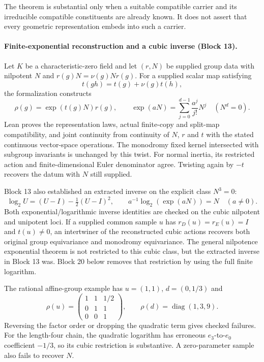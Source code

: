 \documentclass[11pt]{article}
\theoremstyle{definition}
\theoremstyle{remark}
\begin{document}
The theorem is substantial only when a suitable compatible carrier and its irreducible compatible constituents are already known.  It does not assert that every geometric representation embeds into such a carrier.


\paragraph{Finite-exponential reconstruction and a cubic inverse (Block 13).}
Let $K$ be a characteristic-zero field and let $(r,N)$ be supplied group data
with nilpotent $N$ and $r(g)N=\nu(g)Nr(g)$. For a supplied scalar map satisfying
\[
t(gh)=t(g)+\nu(g)t(h),
\]
the formalization constructs
\[
\rho(g)=\exp(t(g)N)r(g),\qquad
\exp(aN)=\sum_{j=0}^{d-1}\frac{a^j}{j!}N^j\quad(N^d=0).
\]
Lean proves the representation laws, actual finite-copy and split-map
compatibility, and joint continuity from continuity of $N$, $r$ and $t$ with
the stated continuous vector-space operations. The monodromy fixed kernel
intersected with subgroup invariants is unchanged by this twist. For normal
inertia, its restricted action and finite-dimensional Euler denominator agree.
Twisting again by $-t$ recovers the datum with $N$ still supplied.

Block 13 also established an extracted inverse on the explicit class $N^3=0$:
\[
\log_2 U=(U-I)-\tfrac12(U-I)^2,\qquad
 a^{-1}\log_2(\exp(aN))=N\quad(a\ne0).
\]
Both exponential/logarithmic inverse identities are checked on the cubic
nilpotent and unipotent loci. If a supplied common sample $u$ has
$r_D(u)=r_E(u)=I$ and $t(u)\ne0$, an intertwiner of the reconstructed cubic
actions recovers both original group equivariance and monodromy equivariance.
The general nilpotence exponential theorem is not restricted to this cubic
class, but the extracted inverse in Block 13 was. Block 20 below removes
that restriction by using the full finite logarithm.

The rational affine-group example has $u=(1,1)$, $d=(0,1/3)$ and
\[
\rho(u)=\begin{pmatrix}1&1&1/2\\0&1&1\\0&0&1\end{pmatrix},
\qquad \rho(d)=\operatorname{diag}(1,3,9).
\]
Reversing the factor order or dropping the quadratic term gives checked
failures. For the length-four chain, the quadratic logarithm has erroneous
$e_3$-to-$e_0$ coefficient $-1/3$, so its cubic restriction is substantive.
A zero-parameter sample also fails to recover $N$.
\end{document}
